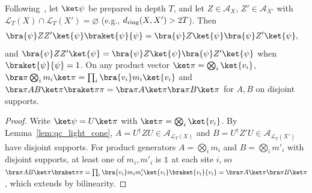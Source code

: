 \begin{lemma}
    \label{lem:qc_light_cone_correlations}
    \leanok
    Following~\cite[Theorem~1]{Malz2024Preparation}, let $\ket\psi$ be prepared in depth $T$, and let $Z\in\mathcal A_X$, $Z'\in\mathcal A_{X'}$ with $\mathcal L_T(X)\cap\mathcal L_T(X')=\varnothing$ (e.g., $d_{\rm ring}(X,X')>2T$). Then
    \begin{align}
        \bra{\psi}ZZ'\ket{\psi}\braket{\psi}{\psi}
         & =\bra{\psi}Z\ket{\psi}\bra{\psi}Z'\ket{\psi},\notag
    \end{align}
    and $\bra{\psi}ZZ'\ket{\psi}=\bra{\psi}Z\ket{\psi}\bra{\psi}Z'\ket{\psi}$ when $\braket{\psi}{\psi}=1$. On any product vector $\ket\pi=\bigotimes_i\ket{v_i}$, $\bra\pi\bigotimes_i m_i\ket\pi=\prod_i\bra{v_i}m_i\ket{v_i}$ and $\bra\pi AB\ket\pi\braket\pi\pi=\bra\pi A\ket\pi\bra\pi B\ket\pi$ for $A,B$ on disjoint supports.
\end{lemma}
\begin{proof}
    \leanok
    Write $\ket\psi=U\ket\pi$ with $\ket\pi=\bigotimes_i\ket{v_i}$. By Lemma~\ref{lem:qc_light_cone}, $A=U^\dagger ZU\in\mathcal A_{\mathcal L_T(X)}$ and $B=U^\dagger Z'U\in\mathcal A_{\mathcal L_T(X')}$ have disjoint supports. For product generators $A=\bigotimes_i m_i$ and $B=\bigotimes_i m'_i$ with disjoint supports, at least one of $m_i,m'_i$ is $\mathbb 1$ at each site $i$, so $\bra\pi AB\ket\pi\braket\pi\pi=\prod_i\bra{v_i}m_im'_i\ket{v_i}\braket{v_i}{v_i}=\bra\pi A\ket\pi\bra\pi B\ket\pi$, which extends by bilinearity.
\end{proof}

